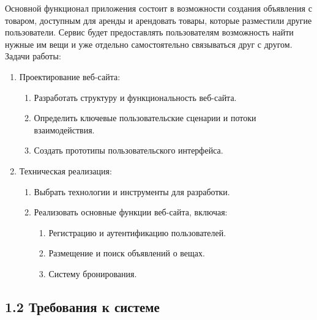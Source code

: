 \documentclass[14pt]{extarticle}
\begin{document}
Основной функционал приложения состоит в возможности создания объявления
с товаром, доступным для аренды и арендовать товары, которые разместили другие пользователи.
Сервис будет предоставлять пользователям возможность найти нужные им вещи
и уже отдельно самостоятельно связываться друг с другом.\\

Задачи работы:
\begin{enumerate}

    \item Проектирование веб-сайта:
    \begin{enumerate}
        \item Разработать структуру и функциональность веб-сайта.
        \item Определить ключевые пользовательские сценарии и потоки взаимодействия.
        \item Создать прототипы пользовательского интерфейса.
    \end{enumerate}
    
    \item Техническая реализация:
    \begin{enumerate}
        \item Выбрать технологии и инструменты для разработки.
        \item Реализовать основные функции веб-сайта, включая:
        \begin{enumerate}
            \item Регистрацию и аутентификацию пользователей.
            \item Размещение и поиск объявлений о вещах.
            \item Систему бронирования.
        \end{enumerate}
    \end{enumerate}

\end{enumerate}

\newpage


\subsection{1.2 Требования к системе}

\bigskip
\end{document}
